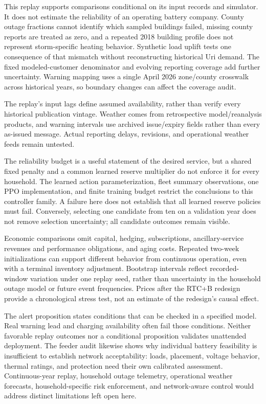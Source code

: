 \documentclass{article}
\begin{document}
This replay supports comparisons conditional on its input records and simulator. It does not estimate the reliability of an operating battery company. County outage fractions cannot identify which sampled buildings failed, missing county reports are treated as zero, and a repeated 2018 building profile does not represent storm-specific heating behavior. Synthetic load uplift tests one consequence of that mismatch without reconstructing historical Uri demand. The fixed modeled-customer denominator and evolving reporting coverage add further uncertainty. Warning mapping uses a single April 2026 zone/county crosswalk across historical years, so boundary changes can affect the coverage audit.

The replay's input lags define assumed availability, rather than verify every historical publication vintage. Weather comes from retrospective model/reanalysis products, and warning intervals use archived issue/expiry fields rather than every as-issued message. Actual reporting delays, revisions, and operational weather feeds remain untested.

The reliability budget is a useful statement of the desired service, but a shared fixed penalty and a common learned reserve multiplier do not enforce it for every household. The learned action parameterization, fleet summary observations, one PPO implementation, and finite training budget restrict the conclusions to this controller family. A failure here does not establish that all learned reserve policies must fail. Conversely, selecting one candidate from ten on a validation year does not remove selection uncertainty; all candidate outcomes remain visible.

Economic comparisons omit capital, hedging, subscriptions, ancillary-service revenues and performance obligations, and aging costs. Repeated two-week initializations can support different behavior from continuous operation, even with a terminal inventory adjustment. Bootstrap intervals reflect recorded-window variation under one replay seed, rather than uncertainty in the household outage model or future event frequencies. Prices after the RTC+B redesign provide a chronological stress test, not an estimate of the redesign's causal effect.

The alert proposition states conditions that can be checked in a specified model. Real warning lead and charging availability often fail those conditions. Neither favorable replay outcomes nor a conditional proposition validates unattended deployment. The feeder audit likewise shows why individual battery feasibility is insufficient to establish network acceptability: loads, placement, voltage behavior, thermal ratings, and protection need their own calibrated assessment. Continuous-year replay, household outage telemetry, operational weather forecasts, household-specific risk enforcement, and network-aware control would address distinct limitations left open here.
\end{document}
